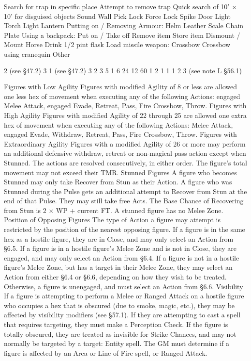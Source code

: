 \documentclass[a4paper]{article}
\begin{document}
\begin{multicols}{3}
Search for trap in specific place
Attempt to remove trap
Quick search of 10’ × 10’ for
disguised objects
Sound Wall
Pick Lock
Force Lock
Spike Door
Light Torch
Light Lantern
Putting on / Removing Armour:
Helm
Leather
Scale
Chain
Plate
Using a backpack:
Put on / Take off
Remove item
Store item
Dismount / Mount Horse
Drink 1/2 pint flask
Load missile weapon:
Crossbow
Crossbow using cranequin
Other

2
(see §47.2)
3
1
(see §47.2)
3
2
3
5
1
6
24
12
60
1
2
1
1
1
2
3
(see note L
§56.1)

Figures with Low Agility
Figures with modified Agility of 8 or less are allowed one less hex of movement when executing
any of the following Actions: engaged Melee Attack, engaged Evade, Retreat, Pass, Fire Crossbow,
Throw.
Figures with High Agility
Figures with modified Agility of 22 through 25 are
allowed one extra hex of movement when executing any of the following Actions: Melee Attack,
engaged Evade, Withdraw, Retreat, Pass, Fire
Crossbow, Throw.
Figures with Extraordinary Agility
Figures with a modified Agility of 26 or more may
perform an additional defensive withdraw, retreat
or non-magical pass action except when Stunned.
The actions are resolved consecutively, in either
order. The figure’s total movement may not exceed
their TMR.
Stunned Figures
A figure who becomes Stunned may only take
Recover from Stun as their Action. A figure who
was Stunned during the Pulse gets an additional
attempt to Recover from Stun at the end of that
Pulse. They may still take free Acts. The Base
Chance of Recovering from Stun is 2 × WP +
current FT. A stunned figure has no Melee Zone.
Position of Opposing Figures
The type of Action a figure may attempt is restricted by the position of the nearest opposing
figure. If a figure is in the same hex as a hostile
figure, they are in Close, and may only select an
Action from §6.5. If a figure is in a hostile figure’s
Melee Zone and is not in Close, they are engaged,
and may only select an Action from §6.4. If a
figure is not in a hostile figure’s Melee Zone, but
has a target in their Melee Zone, they may select an
Action from either §6.4 or §6.6, depending on how
they wish to be treated. Otherwise, a figure is unengaged, and must select an Action from §6.6.
Visibility
If a figure is attempting to perform a Melee or
Ranged Attack on a hostile figure who occupies a
hex that is obscured (due to smoke, magic, etc.),
they may be affected by visibility modifiers (see
§57.1). If they are attempting to cast a spell that
requires targeting, they must make a Perception
Check. If the figure is totally obscured, they are
treated as invisible for Strike Chances, and may not
normally be targeted by a target: Entity spell. The
GM must determine if a figure is affected by an
Area or Line of Fire spell, or Ranged Attack.


\end{multicols}
\end{document}
